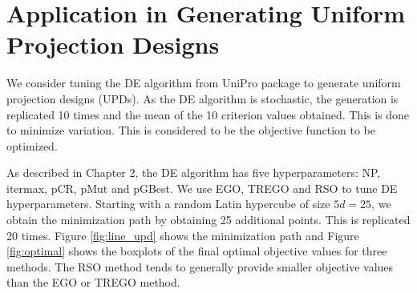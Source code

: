 \documentclass [PhD] {package/uclathes}
\begin{document}
\section{Application in {Generating Uniform Projection Designs}}
We consider tuning the DE algorithm from UniPro package to generate uniform projection designs (UPDs). As the DE algorithm is stochastic, the generation is replicated 10 times and the mean of the 10 criterion values obtained. This is done to minimize variation. This is considered to be the objective function to be optimized.


As described in Chapter 2, the DE algorithm has five hyperparameters: NP, itermax, pCR, pMut and pGBest. We use EGO, TREGO and RSO to tune DE hyperparameters. %
Starting with a random Latin hypercube of size $5d=25$, we obtain the minimization path by obtaining  25 additional points. This is replicated 20 times. {Figure \ref{fig:line_upd} shows the minimization path and Figure \ref{fig:optimal} shows the boxplots of the final optimal objective values for three methods.  The RSO method tends to generally provide smaller objective values than the EGO or TREGO method.}  %
\end{document}
